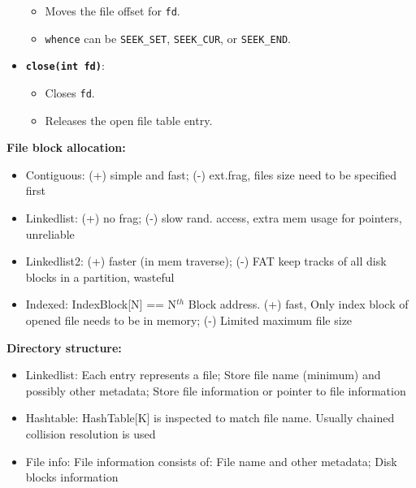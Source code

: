 \documentclass[8pt,twocolumn]{article}
\begin{document}
\begin{itemize}
    \begin{itemize}
      \setlength{\itemsep}{0pt} %
      \setlength{\parskip}{0pt}
      \item Moves the file offset for \texttt{fd}.
      \item \texttt{whence} can be \texttt{SEEK\_SET}, \texttt{SEEK\_CUR}, or \texttt{SEEK\_END}.
    \end{itemize}
\vspace{-0.6em}
  \item \textbf{\texttt{close(int fd)}}:
\vspace{-0.6em}
    \begin{itemize}
      \setlength{\itemsep}{0pt} %
      \setlength{\parskip}{0pt}
      \item Closes \texttt{fd}.
      \item Releases the open file table entry.
    \end{itemize}
\vspace{-0.6em}
\end{itemize}
\vspace{-0.6em}
\textbf{File block allocation:}
\vspace{-0.6em}
\begin{itemize}
  \setlength{\itemsep}{0pt} %
  \setlength{\parskip}{0pt}
  \item Contiguous: (+) simple and fast; (-) ext.frag, files size need to be specified first
  \item Linkedlist: (+) no frag; (-) slow rand. access, extra mem usage for pointers, unreliable
  \item Linkedlist2: (+) faster (in mem traverse); (-) FAT keep tracks of all disk blocks in a partition, wasteful
  \item Indexed: IndexBlock[N] == N$^{th}$ Block address. (+) fast, Only index block of opened file needs to be in memory; (-) Limited maximum file size
\end{itemize}
\vspace{-0.6em}
\textbf{Directory structure:}
\vspace{-0.6em}
\begin{itemize}
  \setlength{\itemsep}{0pt} %
  \setlength{\parskip}{0pt}
  \item Linkedlist: Each entry represents a file; Store file name (minimum) and possibly other metadata; Store file information or pointer to file information  
  \item Hashtable: HashTable[K] is inspected to match file name. Usually chained collision resolution is used  
  \item File info: File information consists of: File name and other metadata; Disk blocks information  
\end{itemize}
\end{document}
